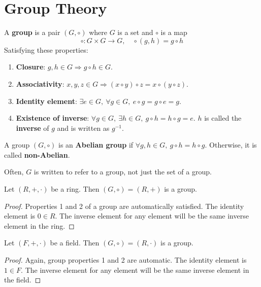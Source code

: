 \section{Group Theory}

\begin{definition}
	A \textbf{group} is a pair $(G, \circ)$ where $G$ is a set and $\circ$ is a map
	\[
		\circ: G \times G \rightarrow G, \quad \circ (g, h) = g \circ h
	\]
	Satisfying these properties:
	\begin{enumerate}
		\item \textbf{Closure}: $g, h \in G \Rightarrow g \circ h \in G$.
		\item \textbf{Associativity}: $x, y, z \in G \Rightarrow (x \circ y) \circ z = x \circ (y \circ z)$.
		\item \textbf{Identity element}: $\exists e \in G, \ \forall g \in G, \ e \circ g = g \circ e = g$.
		\item \textbf{Existence of inverse}: $\forall g \in G, \ \exists h \in G, \ g \circ h = h \circ g = e$. $h$ is called the \textbf{inverse} of $g$ and is written as $g^{-1}$.
	\end{enumerate}
\end{definition}

\begin{definition}
	A group $(G, \circ)$ is an \textbf{Abelian group} if $\forall g, h \in G, \ g \circ h = h \circ g$. Otherwise, it is called \textbf{non-Abelian}.
\end{definition}

\begin{remark}
	Often, $G$ is written to refer to a group, not just the set of a group.
\end{remark}

\begin{lemma}
	Let $(R, +, \cdot)$ be a ring. Then $(G, \circ) = (R, +)$ is a group.
\end{lemma}

\begin{proof}
	Properties 1 and 2 of a group are automatically satisfied. The identity element is $0 \in R$. The inverse element for any element will be the same inverse element in the ring.
\end{proof}

\begin{lemma}
	Let $(F, +, \cdot)$ be a field. Then $(G, \circ) = (R, \cdot)$ is a group.
\end{lemma}

\begin{proof}
	Again, group properties 1 and 2 are automatic. The identity element is $1 \in F$. The inverse element for any element will be the same inverse element in the field.
\end{proof}

